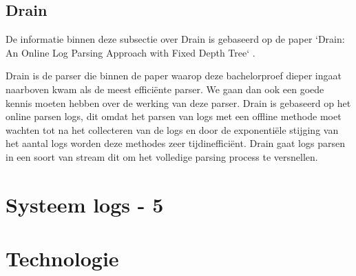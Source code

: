 \subsection{Drain}
De informatie binnen deze subsectie over Drain is gebaseerd op de paper `Drain: An Online Log Parsing Approach with Fixed Depth Tree` \autocite{he2017drain}.

Drain is de parser die binnen de paper waarop deze bachelorproef dieper ingaat \autocite{TBA2019} naarboven kwam als de meest efficiënte parser. We gaan dan ook een goede kennis moeten hebben over de werking van deze parser. Drain is gebaseerd op het online parsen logs, dit omdat het parsen van logs met een offline methode moet wachten tot na het collecteren van de logs en door de exponentiële stijging van het aantal logs worden deze methodes zeer tijdinefficiënt. Drain gaat logs parsen in een soort van stream dit om het volledige parsing process te versnellen.


\section{Systeem logs - 5}
\section{Technologie}
